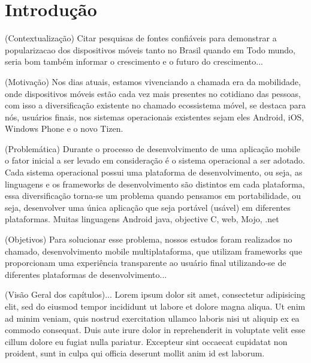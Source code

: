 \chapter{Introdução} %
(Contextualização) Citar pesquisas de fontes confiáveis para demonstrar a
popularizacao dos dispositivos móveis tanto no Brasil quando em Todo mundo,
seria bom também informar o crescimento e o futuro do crescimento...

(Motivação) Nos dias atuais, estamos vivenciando a chamada era da mobilidade, onde dispositivos
móveis estão cada vez mais presentes no cotidiano das pessoas, com isso a
diversificação existente no chamado ecossistema móvel, se destaca para nós,
usuários finais, nos sistemas operacionais existentes sejam eles Android, iOS,
Windows Phone e o novo Tizen.

(Problemática) Durante o processo de desenvolvimento de uma aplicação mobile o
fator inicial a ser levado em consideração é o sistema operacional a ser adotado.
Cada sistema operacional possui uma plataforma de desenvolvimento, ou seja, as
linguagens e os frameworks de desenvolvimento são distintos em cada plataforma,
essa diversificação torna-se um problema quando pensamos em portabilidade,
ou seja, desenvolver uma única aplicação que seja portável (usável) em
diferentes plataformas.
Muitas linguagens Android java, objective C, web, Mojo, .net

(Objetivos) Para solucionar esse problema, nossos estudos foram realizados no
chamado, desenvolvimento mobile multiplataforma, que utilizam frameworks que
proporcionam uma experiência transparente ao usuário final utilizando-se de
diferentes plataformas de desenvolvimento...

(Visão Geral dos capítulos)...
Lorem ipsum dolor sit amet, consectetur adipisicing elit, sed do eiusmod
tempor incididunt ut labore et dolore magna aliqua. Ut enim ad minim veniam,
quis nostrud exercitation ullamco laboris nisi ut aliquip ex ea commodo
consequat. Duis aute irure dolor in reprehenderit in voluptate velit esse
cillum dolore eu fugiat nulla pariatur. Excepteur sint occaecat cupidatat non
proident, sunt in culpa qui officia deserunt mollit anim id est laborum.

